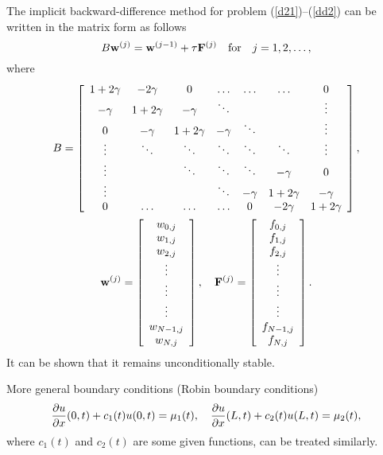   
 
The implicit backward-difference method  for problem
(\ref{d21})--(\ref{dd2}) can be written in the matrix form as follows
\begin{equation}
B{\bf w}^{(j)}={\bf w}^{(j-1)}+\tau {\bf F}^{(j)} \quad \hbox{for} \quad j=1,2,\dots,
\end{equation}
where
\begin{gather}
B=\left[
\begin{array}{ccccccc}
1+2\gamma &-2\gamma &0      &\dots  &\dots  &\dots &0 \\
-\gamma &1+2\gamma &-\gamma &\ddots  &       &     &\vdots \\
0      &-\gamma &1+2\gamma &-\gamma &\ddots &      &\vdots \\
\vdots &\ddots &\ddots &\ddots &\ddots &\ddots &\vdots  \\
\vdots &       &\ddots &\ddots &\ddots &-\gamma &0 \\
\vdots &       &       &\ddots &-\gamma &1+2\gamma &-\gamma \\
0      &\dots  &\dots  &\dots  &0      &-2\gamma &1+2\gamma
\end{array}\right], \\
{\bf w}^{(j)}=\left[
\begin{array}{c}
w_{0,j} \\
w_{1,j} \\
w_{2,j} \\
\vdots \\
\vdots \\
\vdots \\
w_{N-1,j} \\
w_{N,j}
\end{array}\right], \quad
{\bf F}^{(j)}=\left[
\begin{array}{c}
f_{0,j} \\
f_{1,j} \\
f_{2,j} \\
\vdots \\
\vdots \\
\vdots \\
f_{N-1,j} \\
f_{N,j}
\end{array}\right].
\end{gather}
It can be shown that it remains unconditionally stable.
 
More general boundary conditions (Robin boundary conditions)
\begin{equation}
\frac{{\partial} u}{{\partial} x}(0,t)+c_{1}(t)u(0,t)=\mu_{1}(t), \quad
\frac{{\partial} u}{{\partial} x}(L,t)+c_{2}(t)u(L,t)=\mu_{2}(t), \label{d27}
\end{equation}
where $c_{1}(t)$ and $c_{2}(t)$ are some given functions, can be treated
similarly.


